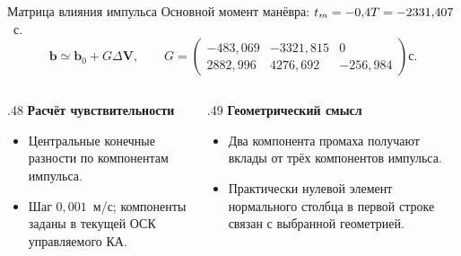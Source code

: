\documentclass[11pt,aspectratio=169,t]{beamer}
\newcommand{\eqcompact}{\fontsize{10}{12}\selectfont}
\newcommand{\derivationmathspacing}{%
  \setlength{\abovedisplayskip}{2pt}%
  \setlength{\belowdisplayskip}{3pt}%
  \setlength{\abovedisplayshortskip}{2pt}%
  \setlength{\belowdisplayshortskip}{2pt}%
  \setlength{\jot}{2pt}}
\newcommand{\vect}[1]{\boldsymbol{#1}}
\begin{document}
\begin{frame}{Матрица влияния импульса}
\relax\derivationmathspacing
Основной момент манёвра: $t_m=-0{,}4T=-2331{,}407$~с.
{\eqcompact\derivationmathspacing
\[
 \vect b\simeq\vect b_0+G\Delta\vect V,\qquad
 G=\begin{pmatrix}
 -483{,}069&-3321{,}815&0\\
 2882{,}996&4276{,}692&-256{,}984
 \end{pmatrix}\text{с}.
\]
}
\begin{columns}[T,onlytextwidth]
\begin{column}{.48\textwidth}
\textbf{Расчёт чувствительности}
\begin{itemize}
\setlength{\itemsep}{4pt}
\item Центральные конечные разности по компонентам импульса.
\item Шаг $0{,}001$~м/с; компоненты заданы в текущей ОСК управляемого КА.
\end{itemize}
\end{column}
\begin{column}{.49\textwidth}
\textbf{Геометрический смысл}
\begin{itemize}
\setlength{\itemsep}{4pt}
\item Два компонента промаха получают вклады от трёх компонентов импульса.
\item Практически нулевой элемент нормального столбца в первой строке связан с выбранной геометрией.
\end{itemize}
\end{column}
\end{columns}
\end{frame}
\end{document}
